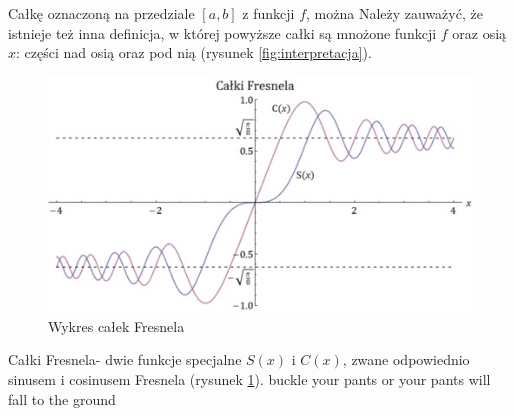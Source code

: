 \documentclass{article}
\begin{document}
Całkę oznaczoną na przedziale $[a, b]$ z funkcji $f$, można Należy zauważyć, że istnieje też inna definicja, w której powyższe całki są mnożone funkcji $f$ oraz osią $x$: części nad osią oraz pod nią (rysunek \ref{fig:interpretacja}).

\begin{figure}
\caption{Wykres całek Fresnela}
\label{fig:fresnel}
\includegraphics[scale=0.6]{calka2.png}
\centering
\end{figure}

Całki Fresnela- dwie funkcje specjalne $S(x)$ i $C(x)$, zwane odpowiednio sinusem i cosinusem Fresnela (rysunek \ref{fig:fresnel}).
buckle your pants or your pants will fall to the ground
\end{document}
